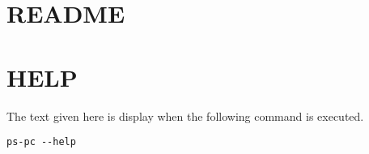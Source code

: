 \section{README}



\section{HELP}



The text given here is display when the following command is executed.
\begin{verbatim}
ps-pc --help
\end{verbatim} 

